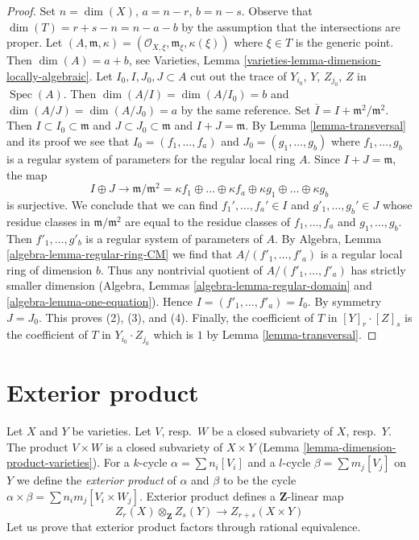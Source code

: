\documentclass{stacks-project}
\theoremstyle{plain}
\theoremstyle{definition}
\theoremstyle{remark}
\numberwithin{equation}{subsection}
\def\Spec{\mathop{\mathrm{Spec}}}
\begin{document}
\begin{proof}
Set $n = \dim(X)$, $a = n - r$, $b = n - s$. Observe that
$\dim(T) = r + s - n = n - a - b$ by the assumption that the
intersections are proper. Let $(A, \mathfrak m, \kappa) =
(\mathcal{O}_{X, \xi}, \mathfrak m_\xi, \kappa(\xi))$ where $\xi \in T$
is the generic point. Then $\dim(A) = a + b$, see
Varieties, Lemma \ref{varieties-lemma-dimension-locally-algebraic}.
Let $I_0, I, J_0, J \subset A$ cut out the trace of
$Y_{i_0}$, $Y$, $Z_{j_0}$, $Z$ in $\Spec(A)$.
Then $\dim(A/I) = \dim(A/I_0) = b$ and $\dim(A/J) = \dim(A/J_0) = a$
by the same reference. Set $\overline{I} = I + \mathfrak m^2/\mathfrak m^2$.
Then $I \subset I_0 \subset \mathfrak m$ and
$J \subset J_0 \subset \mathfrak m$ and $I + J = \mathfrak m$.
By Lemma \ref{lemma-transversal} and its proof we see that
$I_0 = (f_1, \ldots, f_a)$ and $J_0 = (g_1, \ldots, g_b)$
where $f_1, \ldots, g_b$ is a regular system of parameters
for the regular local ring $A$. Since $I + J = \mathfrak m$, the map
$$
I \oplus J \to
\mathfrak m/\mathfrak m^2 =
\kappa f_1
\oplus \ldots \oplus
\kappa f_a
\oplus
\kappa g_1
\oplus \ldots \oplus
\kappa g_b
$$
is surjective. We conclude that we can find
$f_1', \ldots, f_a' \in I$ and $g'_1, \ldots, g_b' \in J$
whose residue classes in $\mathfrak m/\mathfrak m^2$ are equal to the
residue classes of $f_1, \ldots, f_a$ and $g_1, \ldots, g_b$.
Then $f'_1, \ldots, g'_b$ is a regular system of parameters of $A$.
By Algebra, Lemma \ref{algebra-lemma-regular-ring-CM} we find that
$A/(f'_1, \ldots, f'_a)$ is a regular local ring of dimension $b$.
Thus any nontrivial quotient of $A/(f'_1, \ldots, f'_a)$
has strictly smaller dimension
(Algebra, Lemmas \ref{algebra-lemma-regular-domain} and
\ref{algebra-lemma-one-equation}). Hence $I = (f'_1, \ldots, f'_a) = I_0$.
By symmetry $J = J_0$. This proves (2), (3), and (4).
Finally, the coefficient of $T$ in $[Y]_r \cdot [Z]_s$
is the coefficient of $T$ in $Y_{i_0} \cdot Z_{j_0}$ which is
$1$ by Lemma \ref{lemma-transversal}.
\end{proof}



\section{Exterior product}
\label{section-exterior-product}

\noindent
Let $X$ and $Y$ be varieties.
Let $V$, resp.\ $W$ be a closed subvariety of $X$, resp.\ $Y$.
The product $V\times W$ is a closed subvariety of $X\times Y$
(Lemma \ref{lemma-dimension-product-varieties}).
For a $k$-cycle $\alpha = \sum n_i [V_i]$ and a $l$-cycle
$\beta = \sum m_j [V_j]$ on $Y$ we define the
{\it exterior product} of $\alpha$ and $\beta$ to be the cycle
$\alpha \times \beta = \sum n_i m_j [V_i \times W_j]$.
Exterior product defines a $\mathbf{Z}$-linear map
$$
Z_r(X) \otimes_\mathbf{Z} Z_s(Y) \longrightarrow Z_{r + s}(X \times Y)
$$
Let us prove that exterior product factors through rational equivalence.
\end{document}
